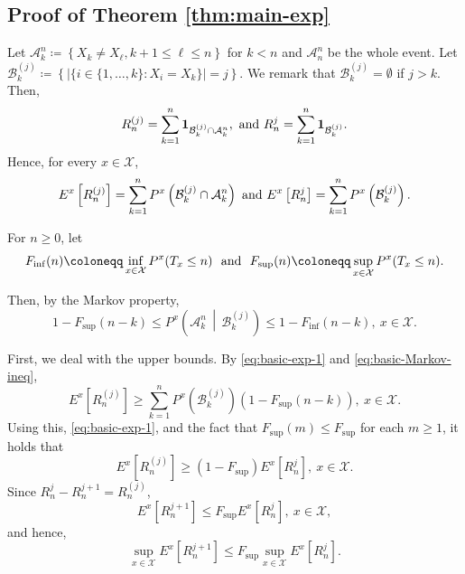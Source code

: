 \documentclass[a4paper, reqno, 11pt]{amsart}
\theoremstyle{definition}
\begin{document}
\subsection{Proof of Theorem \ref{thm:main-exp}} 

Let $\mathcal{A}_{k}^{n} \coloneqq \left\{X_k \ne X_{\ell}, k+1 \le \ell \le n \right\}$ for $k < n$ and $\mathcal{A}_{n}^{n}$ be the whole event. 
Let $\mathcal{B}_{k}^{(j)} \coloneqq \left\{   |\{i \in \{1,\dots,k\} : X_i = X_{k} \}| =  j \right\}$. 
We remark that $\mathcal{B}_{k}^{(j)} = \emptyset$ if $j > k$.  
Then, 
\[ R^{(j)}_{n} = \sum_{k=1}^{n} {\bf 1}_{\mathcal{B}_{k}^{(j)} \cap \mathcal{A}_{k}^{n}}, \textup{ and } R^{j}_{n} = \sum_{k=1}^{n} {\bf 1}_{\mathcal{B}_{k}^{(j)}}. \] 
Hence, for every $x \in \mathcal{X}$, 
\begin{equation}\label{eq:basic-exp-1} 
E^x \left[ R^{(j)}_{n} \right] = \sum_{k=1}^{n} P^x \left(\mathcal{B}_{k}^{(j)} \cap \mathcal{A}_{k}^{n}\right) \textup{ and } E^x \left[ R^{j}_{n} \right] = \sum_{k=1}^{n} P^x \left(\mathcal{B}_{k}^{(j)} \right). 
\end{equation}

For $n \ge 0$, let  
\[ F_{\inf} (n) \coloneqq \inf_{x \in \mathcal{X}} P^x (T_x \le n) \ \textup{ and } \   F_{\sup} (n) \coloneqq \sup_{x \in \mathcal{X}} P^x (T_x \le n).  \]

Then, by the Markov property, 
\begin{equation}\label{eq:basic-Markov-ineq} 
1 - F_{\sup}(n-k) \le P^x \left( \mathcal{A}_{k}^{n} \, \middle| \, \mathcal{B}_{k}^{(j)} \right) \le 1 - F_{\inf}(n-k), \ x \in \mathcal{X}. 
\end{equation}


First, we deal with the upper bounds. 
By \eqref{eq:basic-exp-1} and \eqref{eq:basic-Markov-ineq}, 
\[ E^x \left[ R^{(j)}_{n} \right] \ge \sum_{k=1}^{n} P^x \left(\mathcal{B}_{k}^{(j)} \right) (1- F_{\sup}(n-k)), \ x \in \mathcal{X}. \]
Using this, \eqref{eq:basic-exp-1}, and the fact that $F_{\sup}(m) \le F_{\sup}$ for each $m \ge 1$,   
it holds that 
\begin{equation}\label{eq:comparision-ineq-1} 
E^x \left[ R^{(j)}_{n} \right] \ge (1-F_{\sup}) E^x \left[ R^{j}_{n} \right], \ x \in \mathcal{X}. 
\end{equation}
Since $R_n^j - R_n^{j+1} = R_n^{(j)}$, 
\[ E^x \left[ R^{j+1}_{n} \right] \le F_{\sup} E^x \left[ R^{j}_{n} \right], \ x \in \mathcal{X}, \]
and hence, 
\begin{equation}\label{eq:exp-unif-upperbound} 
\sup_{x \in \mathcal{X}} E^x \left[ R^{j+1}_{n} \right] \le F_{\sup}  \sup_{x \in \mathcal{X}} E^x \left[ R^{j}_{n} \right]. 
\end{equation}
\end{document}
